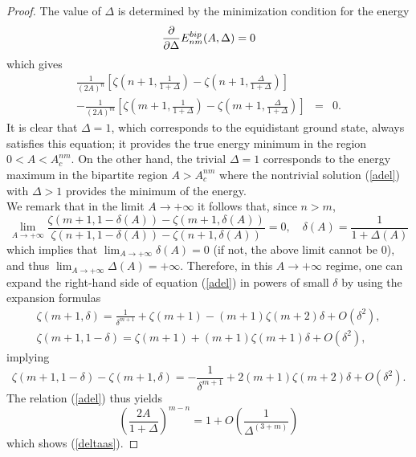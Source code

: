 \documentclass[10pt,a4paper]{amsart}
\begin{document}
\begin{proof}
The value of $\Delta$ is determined by the minimization condition for
the energy    
\begin{equation}
\frac{\partial}{\partial\Delta} E^{\rm bip}_{nm}(A,\Delta) = 0
\end{equation}
which gives
\begin{eqnarray}
\frac{1}{(2 A)^n} \left[ \zeta\left( n+1,\frac{1}{1+\Delta}\right) -
\zeta\left( n+1,\frac{\Delta}{1+\Delta}\right) \right] & & \nonumber \\
- \frac{1}{(2 A)^m} \left[ \zeta\left( m+1,\frac{1}{1+\Delta}\right) -
\zeta\left( m+1,\frac{\Delta}{1+\Delta}\right) \right] & = & 0 .   
\end{eqnarray}
It is clear that $\Delta=1$, which corresponds to the equidistant ground state,
always satisfies this equation; it provides the true energy minimum in the
region $0<A<A_c^{nm}$.
On the other hand, the trivial $\Delta=1$ corresponds to the energy maximum
in the bipartite region $A>A_c^{nm}$ where the nontrivial solution (\ref{adel})
with $\Delta>1$ provides the minimum of the energy.\\
We remark that in the limit $A\to +\infty$ it follows that, since $n>m$,
$$
\lim_{A\to +\infty} \frac{\zeta(m+1,1-\delta(A))-\zeta(m+1,\delta(A))}{
\zeta(n+1,1-\delta(A))-\zeta(n+1,\delta(A))}=0,\quad \delta(A)
=\frac{1}{1+\Delta(A)}
$$
which implies that $\displaystyle\lim_{A\to +\infty} \delta(A)=0$
(if not, the above limit cannot be $0$), and thus
$\displaystyle\lim_{A\to +\infty} \Delta(A)=+\infty$.
Therefore, in this $A\to +\infty$ regime, one can expand
the right-hand side of equation (\ref{adel}) in powers of small $\delta$
by using the expansion formulas
\begin{eqnarray} 
\zeta(m+1,\delta) = \frac{1}{\delta^{m+1}}+\zeta(m+1)-(m+1)\zeta(m+2)\delta
+ O\left( \delta^2\right) , \nonumber \\
\zeta(m+1,1-\delta) =  \zeta(m+1)+ (m+1) \zeta(m+1)\delta
+ O\left( \delta^2\right) , \label{zetaexp} 
\end{eqnarray}
implying
\begin{equation}
\zeta(m+1,1-\delta) - \zeta(m+1,\delta) = - \frac{1}{\delta^{m+1}}
+ 2 (m+1) \zeta(m+2) \delta + O\left( \delta^2\right) .
\end{equation}
The relation (\ref{adel}) thus yields
\begin{equation}
\left( \frac{2A}{1+\Delta} \right)^{m-n} = 1 +
O\left( \frac{1}{\Delta^{(3+m)}} \right)
\end{equation}  
which shows (\ref{deltaas}).
\end{proof}
\end{document}
